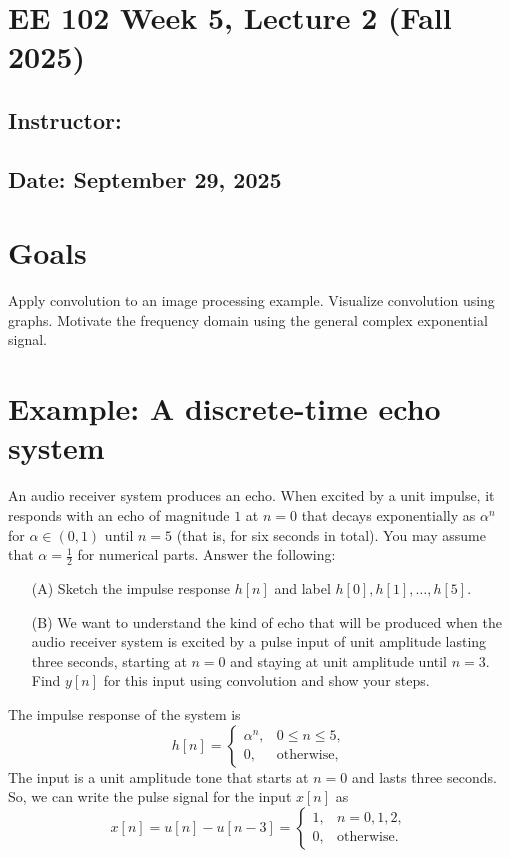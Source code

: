 \documentclass{ee102_notes}
\renewcommand{\releasedate}{September 29, 2025}
\begin{document}
\section*{EE 102 Week 5, Lecture 2 (Fall 2025)}
\subsection*{Instructor: \instructor}
\subsection*{Date: \releasedate}

\section{Goals}
Apply convolution to an image processing example.
Visualize convolution using graphs.
Motivate the frequency domain using the general complex exponential signal.
\section{Example: A discrete-time echo system}
An audio receiver system produces an echo. When excited by a unit impulse, it responds with an echo of magnitude $1$ at $n=0$ that decays exponentially as $\alpha^n$ for $\alpha \in (0,1)$ until $n=5$ (that is, for six seconds in total). You may assume that $\alpha = \tfrac{1}{2}$ for numerical parts. Answer the following:
\begin{enumerate}
    \item[(A)] Sketch the impulse response $h[n]$ and label $h[0], h[1], \ldots, h[5]$.
    \item[(B)] We want to understand the kind of echo that will be produced when the audio receiver system is excited by a pulse input of unit amplitude lasting three seconds, starting at $n=0$ and staying at unit amplitude until $n=3$. Find $y[n]$ for this input using convolution and show your steps.
\end{enumerate}
The impulse response of the system is
\[
h[n]=
\begin{cases}
\alpha^{n}, & 0\le n\le 5,\\
0, & \text{otherwise,}
\end{cases}
\]
The input is a unit amplitude tone that starts at $n=0$ and lasts three seconds. So, we can write the pulse signal for the input $x[n]$ as
\[
x[n]=u[n]-u[n-3]=
\begin{cases}
1, & n=0,1,2,\\
0, & \text{otherwise.}
\end{cases}
\]
\end{document}
